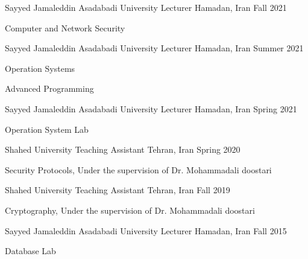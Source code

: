 

\begin{cventries}

  \cventry
    {Sayyed Jamaleddin Asadabadi University} 
    {Lecturer}
    {Hamadan, Iran} 
    {Fall 2021} 
    {
      \begin{cvitems} 
        \item {Computer and Network Security}
      \end{cvitems}
    }

  \cventry
    {Sayyed Jamaleddin Asadabadi University} 
    {Lecturer}
    {Hamadan, Iran} 
    {Summer 2021} 
    {
      \begin{cvitems} 
        \item {Operation Systems}
        \item {Advanced Programming}
      \end{cvitems}
    }

  \cventry
    {Sayyed Jamaleddin Asadabadi University} 
    {Lecturer}
    {Hamadan, Iran} 
    {Spring 2021} 
    {
      \begin{cvitems} 
        \item {Operation System Lab}
      \end{cvitems}
    }

  \cventry
    {Shahed University}
    {Teaching Assistant}
    {Tehran, Iran}
    {Spring 2020}
    {
      \begin{cvitems} 
        \item {Security Protocols, Under the supervision of Dr. Mohammadali doostari}
      \end{cvitems}
    }

  \cventry
    {Shahed University}
    {Teaching Assistant}
    {Tehran, Iran}
    {Fall 2019}
    {
      \begin{cvitems} 
        \item {Cryptography, Under the supervision of Dr. Mohammadali doostari}
      \end{cvitems}
    }

  \cventry
    {Sayyed Jamaleddin Asadabadi University} 
    {Lecturer}
    {Hamadan, Iran} 
    {Fall 2015} 
    {
      \begin{cvitems} 
        \item {Database Lab}
      \end{cvitems}
    }


\end{cventries}
